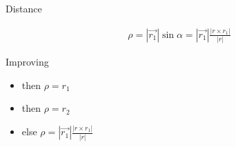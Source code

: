 \documentclass[10pt]{beamer}
\begin{document}
\begin{frame}{Distance}
		\begin{figure}[h]
		\end{figure}
		\begin{align*}
				\rho  = |\overrightarrow{r_1}|\sin\alpha = |\overrightarrow{r_1}|\frac{|r\times r_1|}{|r|}
		\end{align*}
\end{frame}
\begin{frame}{Improving}
		\begin{figure}[h]
		\end{figure}
			\begin{itemize}
				\item{  then $\rho=r_1$}
				\item{  then $\rho=r_2$}
				\item{ \makebox[2.5cm]{} else $\rho = |\overrightarrow{r_1}|\frac{|r\times r_1|}{|r|}$}
			\end{itemize}
\end{frame}
\end{document}
